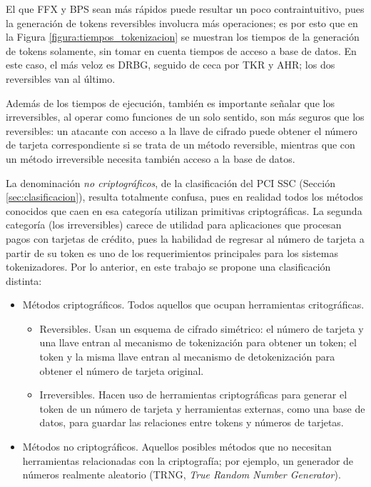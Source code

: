 El que FFX y BPS sean más rápidos puede resultar un poco contraintuitivo, pues
la generación de tokens reversibles involucra más operaciones; es por esto que
en la Figura \ref{figura:tiempos_tokenizacion} se muestran los tiempos de la
generación de tokens solamente, sin tomar en cuenta tiempos de acceso a base de
datos. En este caso, el más veloz es DRBG, seguido de ceca por TKR y AHR; los
dos reversibles van al último.

Además de los tiempos de ejecución, también es importante señalar que los
irreversibles, al operar como funciones de un solo sentido, son más
seguros que los reversibles: un atacante con acceso a la llave de cifrado puede
obtener el número de tarjeta correspondiente si se trata de un método
reversible, mientras que con un método irreversible necesita también acceso a la
base de datos.


La denominación \textit{no criptográficos}, de la clasificación del PCI SSC
(Sección \ref{sec:clasificacion}), resulta totalmente confusa, pues en
realidad todos los métodos conocidos que caen en esa categoría utilizan
primitivas criptográficas. La segunda categoría (los irreversibles) carece de
utilidad para aplicaciones que procesan pagos con tarjetas de crédito, pues la
habilidad de regresar al número de tarjeta a partir de su token es uno de los
requerimientos principales para los sistemas tokenizadores. Por lo anterior, en
este trabajo se propone una clasificación distinta:

\begin{itemize}
  \item Métodos criptográficos. Todos aquellos que ocupan herramientas
    critográficas.
    \begin{itemize}
      \item Reversibles. Usan un esquema de cifrado simétrico: el número
        de tarjeta y una llave entran al mecanismo de tokenización para obtener
        un token; el token y la misma llave entran al mecanismo de
        detokenización para obtener el número de tarjeta original.
      \item Irreversibles. Hacen uso de herramientas criptográficas para generar
	el token de un número de tarjeta y herramientas externas, como una
        base de datos, para guardar las relaciones entre tokens y números de
        tarjetas.
    \end{itemize}
  \item Métodos no criptográficos. Aquellos posibles métodos que no necesitan
    herramientas relacionadas con la criptografía; por ejemplo, un generador de
    números realmente aleatorio (TRNG, \textit{True Random Number Generator}).
\end{itemize}

